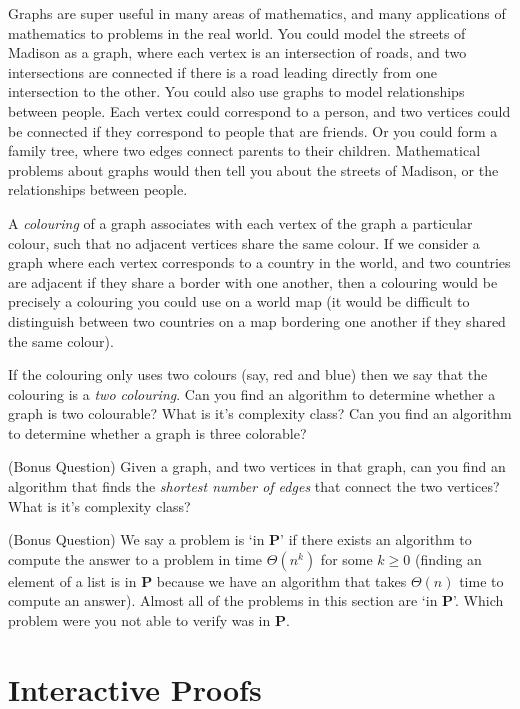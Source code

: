 \documentclass[answers]{exam}
\begin{document}
\begin{questions}
Graphs are super useful in many areas of mathematics, and many applications of mathematics to problems in the real world. You could model the streets of Madison as a graph, where each vertex is an intersection of roads, and two intersections are connected if there is a road leading directly from one intersection to the other. You could also use graphs to model relationships between people. Each vertex could correspond to a person, and two vertices could be connected if they correspond to people that are friends. Or you could form a family tree, where two edges connect parents to their children. Mathematical problems about graphs would then tell you about the streets of Madison, or the relationships between people.

A \emph{colouring} of a graph associates with each vertex of the graph a particular colour, such that no adjacent vertices share the same colour. If we consider a graph where each vertex corresponds to a country in the world, and two countries are adjacent if they share a border with one another, then a colouring would be precisely a colouring you could use on a world map (it would be difficult to distinguish between two countries on a map bordering one another if they shared the same colour).

If the colouring only uses two colours (say, red and blue) then we say that the colouring is a \emph{two colouring}. Can you find an algorithm to determine whether a graph is two colourable? What is it's complexity class? Can you find an algorithm to determine whether a graph is three colorable?

\question (Bonus Question) Given a graph, and two vertices in that graph, can you find an algorithm that finds the \emph{shortest number of edges} that connect the two vertices? What is it's complexity class?

\vspace{3em}

\question (Bonus Question) We say a problem is `in $\mathbf{P}$' if there exists an algorithm to compute the answer to a problem in time $\Theta(n^k)$ for some $k \geq 0$ (finding an element of a list is in $\mathbf{P}$ because we have an algorithm that takes $\Theta(n)$ time to compute an answer). Almost all of the problems in this section are `in $\mathbf{P}$'. Which problem were you not able to verify was in $\mathbf{P}$.

\end{questions}

\section{Interactive Proofs}
\end{document}
